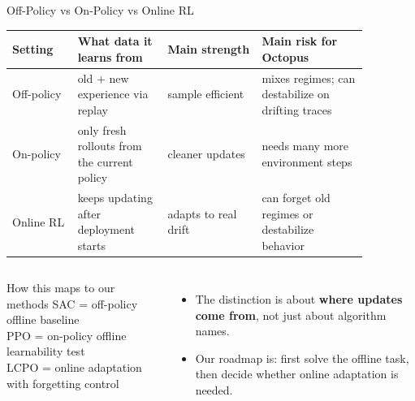 \documentclass[10pt,aspectratio=169]{beamer}
\begin{document}
\begin{frame}{Off-Policy vs On-Policy vs Online RL}
  \scriptsize
  \begin{tabular}{p{0.16\linewidth}p{0.22\linewidth}p{0.23\linewidth}p{0.26\linewidth}}
    \toprule
    \textbf{Setting} & \textbf{What data it learns from} & \textbf{Main strength} & \textbf{Main risk for Octopus} \\
    \midrule
    Off-policy & old + new experience via replay & sample efficient & mixes regimes; can destabilize on drifting traces \\
    On-policy & only fresh rollouts from the current policy & cleaner updates & needs many more environment steps \\
    Online RL & keeps updating after deployment starts & adapts to real drift & can forget old regimes or destabilize behavior \\
    \bottomrule
  \end{tabular}

  \vspace{0.35em}
  \begin{columns}[T,onlytextwidth]
      \begin{block}{How this maps to our methods}
        \scriptsize
        SAC = off-policy offline baseline\\
        PPO = on-policy offline learnability test\\
        LCPO = online adaptation with forgetting control
      \end{block}
      \scriptsize
      \begin{itemize}
        \item The distinction is about \textbf{where updates come from}, not just about algorithm names.
        \item Our roadmap is: first solve the offline task, then decide whether online adaptation is needed.
      \end{itemize}
  \end{columns}
\end{frame}
\end{document}
